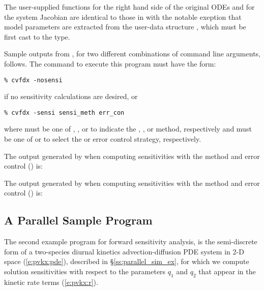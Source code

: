 The user-supplied functions  for the right hand side of the original ODEs and
 for the system Jacobian are identical to those in  with the 
notable exeption that model parameters are extracted from the user-data structure
, which must be first cast to the  type.

Sample outputs from , for two different combinations of command line arguments, 
follows. The command to execute this program must have the form:
\begin{verbatim}
% cvfdx -nosensi
\end{verbatim} 
if no sensitivity calculations are desired, or
\begin{verbatim}
% cvfdx -sensi sensi_meth err_con
\end{verbatim}
where  must be one of , , or  to
indicate the , , or  method,
respectively and  must be one of  or  to
select the  or  error control strategy, respectively.

The output generated by  when computing sensitivities with the 
method and  error control () is:
{\small}

The output generated by  when computing sensitivities with the 
method and  error control () is:
{\small}


\subsection{A Parallel Sample Program}\label{ss:parallel_fwd_ex}

The second example program for forward sensitivity analysis,  is the
semi-discrete form of a two-species diurnal kinetics advection-diffusion PDE 
system in 2-D space (\ref{e:pvkx:pde}), described in \S\ref{ss:parallel_sim_ex}, 
for which we compute solution sensitivities with respect to the parameters $q_1$ 
and $q_2$ that appear in the kinetic rate terms (\ref{e:pvkx:r}).

